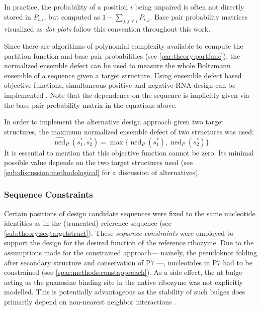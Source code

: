 \documentclass[../../master.tex]{subfiles}
\begin{document}
In practice, the probability of a position $i$ being unpaired is often not directly stored in $P_{i,i}$, but computed as $1 - \sum_{j, j \ne i} P_{i,j}$.
Base pair probability matrices visualized as \emph{dot plots} follow this convention throughout this work.

Since there are algorithms of polynomial complexity available to compute the partition function and base pair probabilities (see \autoref{par:theory:partfunc}), the normalized ensemble defect can be used to measure the whole Boltzmann ensemble of a sequence given a target structure.
Using ensemble defect based objective functions, simultaneous positive and negative RNA design can be implemented \parencite{dirks_paradigms_2004}.
Note that the dependence on the sequence is implicitly given via the base pair probability matrix in the equations above.

In order to implement the alternative design approach given two target structures, the maximum normalized ensemble defect of two structures was used:
\begin{equation}\label{eq:maxned}
	\widehat{\operatorname{ned}}_P(s_1^*, s_2^*) = \max \{ \operatorname{ned}_P(s_1^*), \operatorname{ned}_P(s_2^*) \} 
\end{equation}
It is essential to mention that this objective function cannot be zero. 
Its minimal possible value depends on the two target structures used (see \autoref{sub:discussion:methodological} for a discussion of alternatives).

\subsubsection{Sequence Constraints}
\label{ssub:methods:seq_constraints}

Certain positions of design candidate sequences were fixed to the same nucleotide identities as in the (truncated) reference sequence (see \autoref{sub:theory:seqtargetstruct}).
These \emph{sequence constraints} were employed to support the design for the desired function of the reference ribozyme.
Due to the assumptions made for the constrained approach--- namely, the pseudoknot folding after secondary structure and conservation of P7 ---, nucleotides in P7 had to be constrained (see \autoref{spar:methods:constapproach}).
As a side effect, the \unit[1]{nt} bulge acting as the guanosine binding site in the native ribozyme was not explicitly modelled.
This is potentially advantageous as the stability of such bulges does primarily depend on non-nearest neighbor interactions \parencite{blose_non-nearest-neighbor_2007}.
\end{document}
